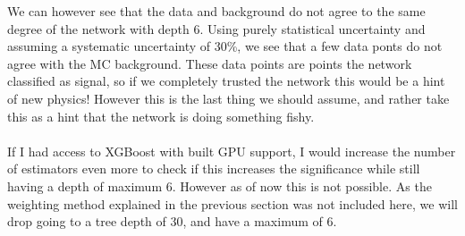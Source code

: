 \documentclass[12pt, a4paper]{book}
\begin{document}
We can however see that the data and background do not agree to the same degree of the network with depth 6. Using purely statistical uncertainty and assuming a systematic uncertainty of 30\%, we see that a few data ponts do not agree with the MC background.
These data points are points the network classified as signal, so if we completely trusted the network this would be a hint of new physics! 
However this is the last thing we should assume, and rather take this as a hint that the network is doing something fishy.\\
\\If I had access to XGBoost with built GPU support, I would increase the number of estimators even more to check if this increases the significance while still having a depth of maximum 6.
However as of now this is not possible. As the weighting method explained in the previous section was not included here, we will drop going to a tree depth of 30, and have a maximum of 6.
\end{document}
